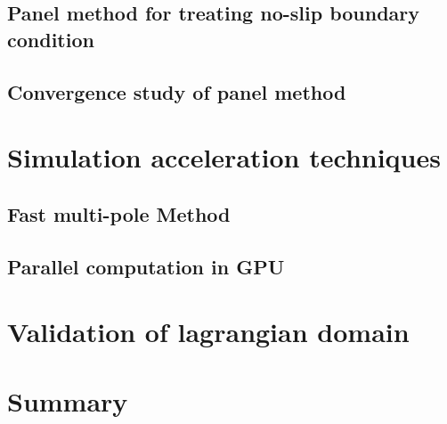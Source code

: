 \subsection{Panel method for treating no-slip boundary condition}

\subsection{Convergence study of panel method}

\section{Simulation acceleration techniques}

\subsection{Fast multi-pole Method}

\subsection{Parallel computation in GPU}

\section{Validation of lagrangian domain}

\section{Summary}



%
%
%
%
